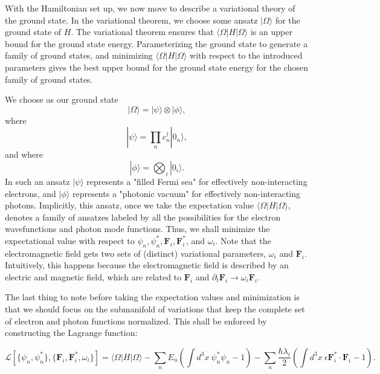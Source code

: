 \documentclass[aps,prb,onecolumn,
	groupedaddress,superscriptaddress,
	amsfonts,amssymb,amsmath,floatfix,
	citeautoscript]{revtex4-1}
\begin{document}
With the Hamiltonian set up, we now move to describe a variational theory of the ground state. In the variational theorem, we choose some ansatz $|\Omega\rangle$ for the ground state of $H$. The variational theorem ensures that $\langle \Omega|H|\Omega\rangle$ is an upper bound for the ground state energy. Parameterizing the ground state to generate a family of ground states, and minimizing $\langle \Omega|H|\Omega\rangle$ with respect to the introduced parameters gives the best upper bound for the ground state energy for the chosen family of ground states. 

We choose as our ground state
\begin{equation}
|\Omega\rangle = |\psi\rangle \otimes |\phi\rangle,
\end{equation}
where
\begin{equation}
|\psi\rangle = \prod\limits_n c_n^{\dagger}|0_n\rangle,
\end{equation}
and where
\begin{equation}
|\phi\rangle = \bigotimes_i|0_i\rangle.
\end{equation}
In such an ansatz $|\psi\rangle$ represents a "filled Fermi sea" for effectively non-interacting electrons, and $|\phi\rangle$ represents a "photonic vacuum" for effectively non-interacting photons. Implicitly, this ansatz, once we take the expectation value $\langle \Omega|H|\Omega\rangle$, denotes a family of ansatzes labeled by all the possibilities for the electron wavefunctions and photon mode functions. Thus, we shall minimize the expectational value with respect to $\psi_n, \psi_n^*, \mathbf{F}_i, \mathbf{F}_i^*$, and $\omega_i$. Note that the electromagnetic field gets two sets of (distinct) variational parameters, $\omega_i$ and $\mathbf{F}_i$. Intuitively, this happens because the electromagnetic field is described by an electric and magnetic field, which are related to $\mathbf{F}_i$ and $\partial_t \mathbf{F}_i \rightarrow \omega_i\mathbf{F}_i$.

The last thing to note before taking the expectation values and minimization is that we should focus on the submanifold of variations that keep the complete set of electron and photon functions normalized. This shall be enforced by constructing the Lagrange function:
\begin{widetext}
\begin{equation}
\mathcal{L}[\{ \psi_n,\psi_n^* \},\{ \mathbf{F}_i,\mathbf{F}_i^*,\omega_i \}] = \langle \Omega |H|\Omega\rangle - \sum_n E_n\left(\int d^3x ~\psi_n^*\psi_n - 1 \right) - \sum_n \frac{\hbar\lambda_i}{2}\left(\int d^3x ~\epsilon\mathbf{F}_i^*\cdot\mathbf{F}_i - 1 \right).
\end{equation}
\end{widetext}
\end{document}
